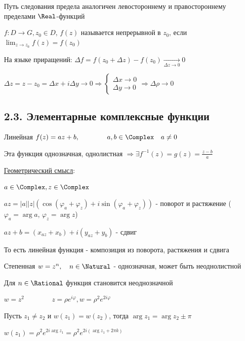 \Nota Путь следования предела аналогичен левостороннему и правостороннему пределами $\Real$-функций

\hypertarget{continuity}{}


$f : D \longrightarrow G, z_0 \in D$, $f(z)$ называется непрерывной в $z_0$, если $\lim_{z \to z_0} f(z) = f(z_0)$

На языке приращений: $\Delta f = f(z_0 + \Delta z) - f(z_0) \underset{\Delta z \to 0}{\longrightarrow} 0$

$\Delta z = z - z_0 = \Delta x + i \Delta y \to 0 \Longrightarrow 
\begin{cases}\Delta x \to 0 \\ \Delta y \to 0\end{cases} \Longrightarrow 
\Delta \rho \to 0$

\subsection{2.3. Элементарные комплексные функции}

\hypertarget{elementary_functions}{}

 Линейная $f(z) = az + b, \qquad\qquad a, b \in \Complex \quad a \neq 0$

Эта функция однозначная, однолистная $\Longrightarrow \exists f^{-1}(z) = g(z) = \frac{z - b}{a}$

\underline{Геометрический смысл}:

$a \in \Complex, z \in \Complex$

$az = |a| |z| (\cos (\varphi_a + \varphi_z) + i \sin (\varphi_a + \varphi_z))$ - поворот и растяжение 
($\varphi_a = \arg a$, $\varphi_z = \arg z$)

$az + b = (x_{az} + x_b) + i (y_{az} + y_b)$ - сдвиг

То есть линейная функция - композиция из поворота, растяжения и сдвига

 Степенная $w = z^n, \quad n \in \Natural$ - однозначная, может быть неоднолистной

Для $n \in \Rational$ функция становится неоднозначной

\Exs $w = z^2 \qquad\qquad z = \rho e^{i\varphi}, w = \rho^2 e^{2i\varphi}$

Пусть $z_1 \neq z_2$ и $w(z_1) = w(z_2)$, тогда $\arg z_1 = \arg z_2 \pm \pi$ 

$w(z_1) = \rho^2 e^{2i\arg z_1} = \rho^2 e^{2i (\arg z_1 + 2\pi k)}$


